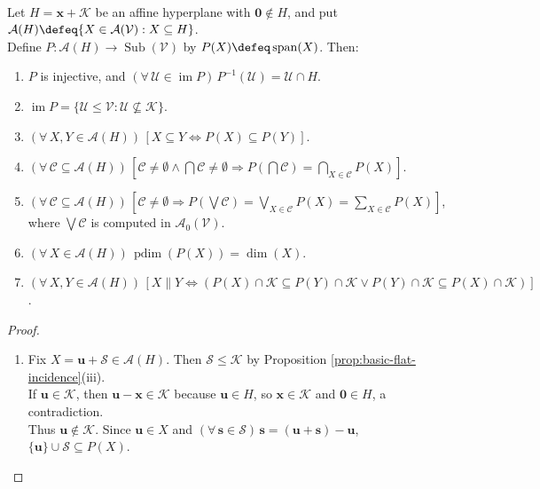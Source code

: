 \begin{theorem} \label{thm:linear-span-map-affine-to-projective} \\
Let $H=\mathbf{x}+\mathcal{K}$ be an affine hyperplane with $\mathbf{0}\notin H$, and put $\mathcal{A}(H)\defeq\{X\in\mathcal{A}(\mathcal{V}):X\subseteq H\}$.\\
Define $P:\mathcal{A}(H)\to\operatorname{Sub}(\mathcal{V})$ by $P(X)\defeq\operatorname{span}(X)$. Then:
\begin{enumerate}[label=(\roman*)]
\setlength{\itemsep}{0pt}
\item $P$ is injective, and $(\forall\,\mathcal{U}\in\operatorname{im}P)\,P^{-1}(\mathcal{U})=\mathcal{U}\cap H$.
\item $\operatorname{im}P=\{\mathcal{U}\leq\mathcal{V}:\mathcal{U}\nsubseteq\mathcal{K}\}$.
\item $(\forall\,X,Y\in\mathcal{A}(H))\,[X\subseteq Y\iff P(X)\subseteq P(Y)]$.
\item $(\forall\,\mathcal{C}\subseteq\mathcal{A}(H))\,[\mathcal{C}\neq\emptyset\land\bigcap\mathcal{C}\neq\emptyset\Rightarrow P(\bigcap\mathcal{C})=\bigcap\limits_{X\in\mathcal{C}}P(X)]$.
\item $(\forall\,\mathcal{C}\subseteq\mathcal{A}(H))\,[\mathcal{C}\neq\emptyset\Rightarrow P(\bigvee\mathcal{C})=\bigvee\limits_{X\in\mathcal{C}}P(X)=\sum\limits_{X\in\mathcal{C}}P(X)]$, where $\bigvee\mathcal{C}$ is computed in $\mathcal{A}_0(\mathcal{V})$.
\item $(\forall\,X\in\mathcal{A}(H))\,\operatorname{pdim}(P(X))=\dim(X)$.
\item $(\forall\,X,Y\in\mathcal{A}(H))\,[X\parallel Y\iff(P(X)\cap\mathcal{K}\subseteq P(Y)\cap\mathcal{K}\lor P(Y)\cap\mathcal{K}\subseteq P(X)\cap\mathcal{K})]$.
\end{enumerate}
\begin{proof}
\begin{enumerate}[label=(\roman*)]
\setlength{\itemsep}{0pt}
\item[$(i)$] Fix $X=\mathbf{u}+\mathcal{S}\in\mathcal{A}(H)$. Then $\mathcal{S}\leq\mathcal{K}$ by Proposition \ref{prop:basic-flat-incidence}(iii).\\
If $\mathbf{u}\in\mathcal{K}$, then $\mathbf{u}-\mathbf{x}\in\mathcal{K}$ because $\mathbf{u}\in H$, so $\mathbf{x}\in\mathcal{K}$ and $\mathbf{0}\in H$, a contradiction.\\
Thus $\mathbf{u}\notin\mathcal{K}$. Since $\mathbf{u}\in X$ and $(\forall\,\mathbf{s}\in\mathcal{S})\,\mathbf{s}=(\mathbf{u}+\mathbf{s})-\mathbf{u}$, $\{\mathbf{u}\}\cup\mathcal{S}\subseteq P(X)$.\\

\end{enumerate}
\end{proof}
\end{theorem}
